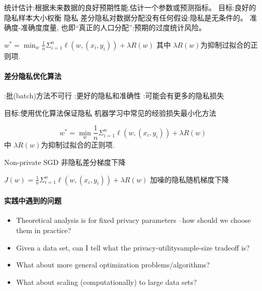 统计估计:根据未来数据的良好预期性能,估计一个参数或预测指标。
目标:良好的隐私样本大小权衡
隐私 差分隐私对数据分配没有任何假设:隐私是无条件的。
准确度-准确度度量, 也即“真正的人口分配”:预期的过度统计风险。


$w^* =\min_w \frac{1}{n} \Sigma_{i=1}^n \ell(w,(x_i,y_i)) + \lambda R(w)$
其中  $\lambda R(w)$为抑制过拟合的正则项.


\paragraph{差分隐私优化算法}

\begin{itemize}
:批(batch)方法不可行
:更好的隐私和准确性
:可能会有更多的隐私损失
\end{itemize}


目标:使用优化算法保证隐私
机器学习中常见的经验损失最小化方法

$$w^* =\min_w \frac{1}{n} \Sigma_{i=1}^n \ell(w,(x_i,y_i)) + \lambda R(w)$$
中  $\lambda R(w)$为抑制过拟合的正则项.


Non-private SGD 非隐私差分梯度下降

$J(w)=\frac{1}{n} \Sigma_{i=1}^n \ell(w,(x_i,y_i)) + \lambda R(w)$
加噪的隐私随机梯度下降

 


\paragraph{ 实践中遇到的问题}

\begin{itemize}
    \item  Theoretical analysis is for fixed privacy parameters –how should we choose them in practice?
    \item Given a data set, can I tell what the privacy-utilitysample-size tradeoff is?
\item What about more general optimization problems/algorithms?
\item What about scaling (computationally) to large data sets?
\end{itemize}